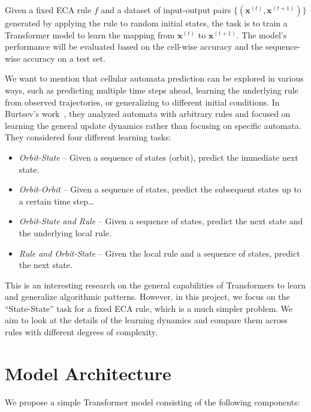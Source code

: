 \documentclass[runningheads]{llncs}
\begin{document}
Given a fixed ECA rule $f$ and a dataset of input-output pairs $\{(\mathbf{x}^{(t)}, \mathbf{x}^{(t+1)})\}$ generated by applying the rule to random initial states, the task is to train a Transformer model to learn the mapping from $\mathbf{x}^{(t)}$ to $\mathbf{x}^{(t+1)}$. The model's performance will be evaluated based on the cell-wise accuracy and the sequence-wise accuracy on a test set.

We want to mention that cellular automata prediction can be explored in various ways, such as predicting multiple time steps ahead, learning the underlying rule from observed trajectories, or generalizing to different initial conditions. In Burtsev's work~\cite{burtsev}, they analyzed automata with arbitrary rules and focused on learning the general update dynamics rather than focusing on specific automata. They considered four different learning tasks:

\begin{itemize}
    \item \textit{Orbit-State} -- Given a sequence of states (orbit), predict the immediate next state.
    \item \textit{Orbit-Orbit} -- Given a sequence of states, predict the subsequent states up to a certain time step\dots
    \item \textit{Orbit-State and Rule} -- Given a sequence of states, predict the next state and the underlying local rule.
    \item \textit{Rule and Orbit-State} -- Given the local rule and a sequence of states, predict the next state.
\end{itemize}

This is an interesting research on the general capabilities of Transformers to learn and generalize algorithmic patterns. However, in this project, we focus on the ``State-State'' task for a fixed ECA rule, which is a much simpler problem. We aim to look at the details of the learning dynamics and compare them across rules with different degrees of complexity.


\section{Model Architecture}
\label{sec:model-architecture}

We propose a simple Transformer model consisting of the following components:
\end{document}
